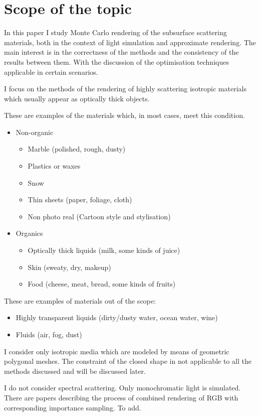 \section{Scope of the topic}
\label{section:scope}
In this paper I study Monte Carlo rendering of the subsurface scattering
materials, both in the context of light simulation and approximate rendering.
The main interest is in the correctness of the methods and the
consistency of the results between them. With the discussion of the optimisation
techniques applicable in certain scenarios.

I focus on the methods of the rendering of highly scattering isotropic materials
which usually appear as optically thick objects.

These are examples of the materials which, in most cases, meet this condition.
\begin{itemize}
    \item Non-organic
    \begin{itemize}
        \item Marble (polished, rough, dusty)
        \item Plastics or waxes
        \item Snow
        \item Thin sheets (paper, foliage, cloth)
        \item Non photo real (Cartoon style and stylisation)
    \end{itemize}
    \item Organics
    \begin{itemize}
    \item Optically thick liquids (milk, some kinds of juice)
        \item Skin (sweaty, dry, makeup)
        \item Food (cheese, meat, bread, some kinds of fruits)
    \end{itemize}
\end{itemize}
These are examples of materials out of the scope:
\begin{itemize}
    \item Highly transparent liquids (dirty/dusty water, ocean water, wine)
    \item Fluids (air, fog, dust)
\end{itemize}
I consider only isotropic media which are modeled by means of geometric
polygonal meshes. The constraint of the closed shape in not applicable to all
the methods discussed and will be discussed later.

I do not consider spectral scattering. Only monochromatic light is simulated.
There are papers describing the process of combined rendering of RGB with
corresponding importance sampling. To add.

